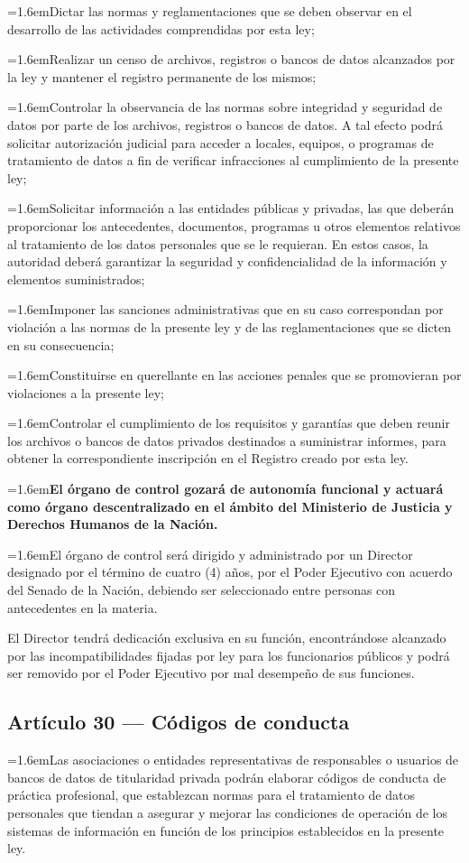 \documentclass[10pt,a4paper]{article}
\newcommand{\articulo}[1]{\subsection{#1}}
\newcommand{\inciso}[2]{\par{\hangindent=1.6em\hangafter=1\makebox[1.6em][l]{#1}#2\par}}
\newcommand{\observado}[1]{\textbf{#1}}
\begin{document}
\inciso{b)}{Dictar las normas y reglamentaciones que se deben observar en el desarrollo de las actividades comprendidas por esta ley;}

\inciso{c)}{Realizar un censo de archivos, registros o bancos de datos alcanzados por la ley y mantener el registro permanente de los mismos;}

\inciso{d)}{Controlar la observancia de las normas sobre integridad y seguridad de datos por parte de los archivos, registros o bancos de datos. A tal efecto podrá solicitar autorización judicial para acceder a locales, equipos, o programas de tratamiento de datos a fin de verificar infracciones al cumplimiento de la presente ley;}

\inciso{e)}{Solicitar información a las entidades públicas y privadas, las que deberán proporcionar los antecedentes, documentos, programas u otros elementos relativos al tratamiento de los datos personales que se le requieran. En estos casos, la autoridad deberá garantizar la seguridad y confidencialidad de la información y elementos suministrados;}

\inciso{f)}{Imponer las sanciones administrativas que en su caso correspondan por violación a las normas de la presente ley y de las reglamentaciones que se dicten en su consecuencia;}

\inciso{g)}{Constituirse en querellante en las acciones penales que se promovieran por violaciones a la presente ley;}

\inciso{h)}{Controlar el cumplimiento de los requisitos y garantías que deben reunir los archivos o bancos de datos privados destinados a suministrar informes, para obtener la correspondiente inscripción en el Registro creado por esta ley.}

\inciso{2.}{\observado{El órgano de control gozará de autonomía funcional y actuará como órgano descentralizado en el ámbito del Ministerio de Justicia y Derechos Humanos de la Nación.}}

\inciso{3.}{El órgano de control será dirigido y administrado por un Director designado por el término de cuatro (4) años, por el Poder Ejecutivo con acuerdo del Senado de la Nación, debiendo ser seleccionado entre personas con antecedentes en la materia.}

El Director tendrá dedicación exclusiva en su función, encontrándose alcanzado por las incompatibilidades fijadas por ley para los funcionarios públicos y podrá ser removido por el Poder Ejecutivo por mal desempeño de sus funciones.

\articulo{Artículo 30 --- Códigos de conducta}
\inciso{1.}{Las asociaciones o entidades representativas de responsables o usuarios de bancos de datos de titularidad privada podrán elaborar códigos de conducta de práctica profesional, que establezcan normas para el tratamiento de datos personales que tiendan a asegurar y mejorar las condiciones de operación de los sistemas de información en función de los principios establecidos en la presente ley.}
\end{document}
